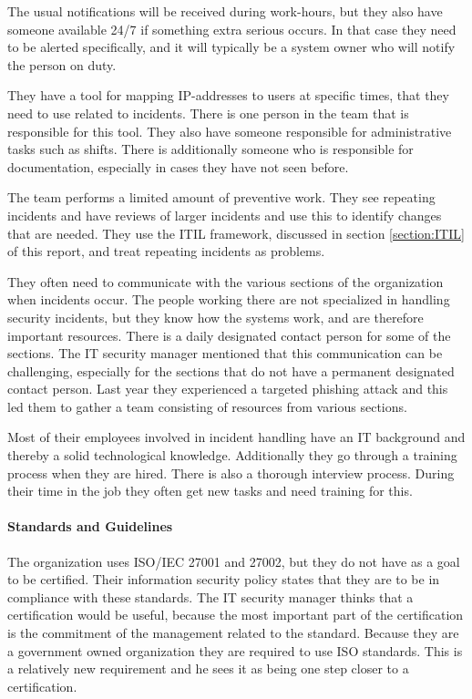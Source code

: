 The usual notifications will be received during work-hours, but they also have someone available 24/7 if something extra serious occurs. In that case they need to be alerted specifically, and it will typically be a system owner who will notify the person on duty.

They have a tool for mapping IP-addresses to users at specific times, that they need to use related to incidents. There is one person in the team that is responsible for this tool. They also have someone responsible for administrative tasks such as shifts. There is additionally someone who is responsible for documentation, especially in cases they have not seen before.

The team performs a limited amount of preventive work. They see repeating incidents and have reviews of larger incidents and use this to identify changes that are needed. They use the \ac{ITIL} framework, discussed in section \ref{section:ITIL} of this report, and treat repeating incidents as problems.

They often need to communicate with the various sections of the organization when incidents occur. The people working there are not specialized in handling security incidents, but they know how the systems work, and are therefore important resources. There is a daily designated contact person for some of the sections. The IT security manager mentioned that this communication can be challenging, especially for the sections that do not have a permanent designated contact person. Last year they experienced a targeted phishing attack and this led them to gather a team consisting of resources from various sections.

Most of their employees involved in incident handling have an IT background and thereby a solid technological knowledge. Additionally they go through a training process when they are hired. There is also a thorough interview process. During their time in the job they often get new tasks and need training for this. 

\paragraph{Standards and Guidelines}
The organization uses \acs{ISO}/\acs{IEC} 27001 and 27002, but they do not have as a goal to be certified. Their information security policy states that they are to be in compliance with these standards. The IT security manager thinks that a certification would be useful, because the most important part of the certification is the commitment of the management related to the standard. Because they are a government owned organization they are required to use \acs{ISO} standards. This is a relatively new requirement and he sees it as being one step closer to a certification.

